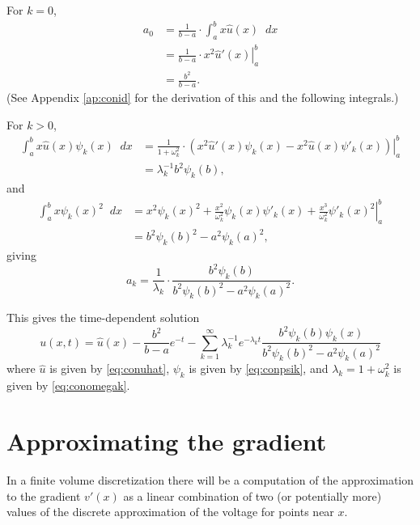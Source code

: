 \documentclass[parskip=half]{scrartcl}
\newcommand{\Int}[2]{\int_{#1}^{#2}\!}
\newcommand{\D}{\mathop{}\!d}
\theoremstyle{nonumberplain}
\begin{document}
For $k=0$,
\begin{equation}
    \begin{aligned}
        a_0 &= \frac{1}{b-a} \cdot \Int{a}{b} x \hat u(x) \D x\\
        &= \frac{1}{b-a} \cdot \left. x^2\hat u'(x)\right|_a^b\\
        &= \frac{b^2}{b-a}.
    \end{aligned}
\end{equation}
(See Appendix \ref{ap:conid} for the derivation of this and the following integrals.)

For $k>0$,
\begin{equation}
    \begin{aligned}
        \Int{a}{b} x \hat u(x)\psi_k(x) \D x
        &= \frac{1}{1+\omega_k^2} \cdot \left. (x^2\hat u'(x)\psi_k(x)-x^2\hat u(x)\psi'_k(x))\right|_a^b\\
        &= \lambda_k^{-1} b^2\psi_k(b),
    \end{aligned}
\end{equation}
and
\begin{equation}
    \begin{aligned}
        \Int{a}{b} x \psi_k(x)^2 \D x
        &= \left.
        x^2\psi_k(x)^2 + \frac{x^2}{\omega_k^2}\psi_k(x)\psi'_k(x)
        + \frac{x^3}{\omega_k^2}\psi'_k(x)^2
        \right|_a^b\\
        &= b^2\psi_k(b)^2 - a^2\psi_k(a)^2,
    \end{aligned}
\end{equation}
giving
\begin{equation}
    a_k = \frac{1}{\lambda_k}\cdot \frac{b^2\psi_k(b)}{b^2\psi_k(b)^2-a^2\psi_k(a)^2}.
\end{equation}

This gives the time-dependent solution
\begin{equation}
    u(x,t) = \hat u(x) - \frac{b^2}{b-a}e^{-t} -
    \sum_{k=1}^{\infty} \lambda_k^{-1} e^{-\lambda_k t}
    \frac{b^2\psi_k(b)\psi_k(x)}{b^2\psi_k(b)^2-a^2\psi_k(a)^2}
\end{equation}
where $\hat u$ is given by \eqref{eq:conuhat}, $\psi_k$ is given by \eqref{eq:conpsik},
and $\lambda_k = 1 + \omega_k^2$ is given by \eqref{eq:conomegak}.


\section{Approximating the gradient}

In a finite volume discretization there
will be a computation of the approximation to the gradient
$v'(x)$ as a linear combination of two (or potentially more)
values of the discrete approximation of the voltage for points
near $x$.
\end{document}
